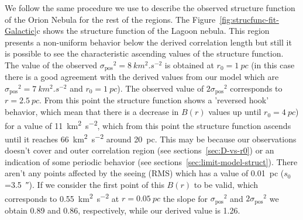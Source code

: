\documentclass[fleqn,usenatbib, useAMS, a4paper]{mnras}
\newcommand\pos{\ensuremath{_{\mathrm{pos}}}}
\begin{document}
We follow the same procedure we use to describe the observed structure function of the Orion Nebula for the rest of the regions.
The Figure~\ref{fig:strucfunc-fit-Galactic}c shows the structure function of the Lagoon nebula.
This region presents a non-uniform behavior below the derived correlation length but still it is possible to see the characteristic ascending values of the structure function.
The value of the observed \(\sigma\pos^2 = \SI{8}{km^{2}.s^{-2}}\) is obtained at \(r_0 = \SI{1}{pc} \) (in this case there is a good agreement with the derived values from our model which are \(\sigma\pos^2 = \SI{7}{km^{2}.s^{-2}}\) and \(r_0 = \SI{1}{pc} \)).
The observed value of \(2\sigma\pos^2\) corresponds to \(r = \SI{2.5}{pc} \).
From this point the structure function shows a 'reversed hook' behavior, which mean that there is a decrease in \(B(r)\) values up until \(r_0 = \SI{4}{pc} \)) for a value of \SI{11}{km^{2}.s^{-2}}, which from this point the structure function ascends until it reaches \SI{66}{km^{2}.s^{-2}} around \SI{20}{pc}.
This may be because our observations doesn't cover and outer correlation region (see sections~\ref{sec:D-vs-r0}) or an indication of some periodic behavior (see sections~\ref{sec:limit-model-struct}).
There aren't any points affected by the seeing (RMS) which has a value of \SI{0.01}{pc} (\(s_0\)=\SI{3.5}{\arcsecond}).
If we consider the first point of this \(B(r)\) to be valid, which corresponds to \SI{0.55}{km^{2}.s^{-2}} at \(r = \SI{0.05}{pc} \) the slope for \(\sigma\pos^2\) and \(2\sigma\pos^2\) we obtain \num{0.89} and \num{0.86}, respectively, while our derived value is \num{1.26}.
\end{document}
